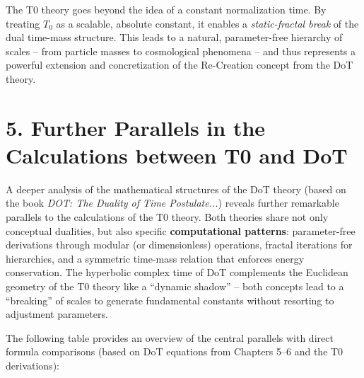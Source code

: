 	\begin{keyresultbox}
		The T0 theory goes beyond the idea of a constant normalization time. By treating \( T_0 \) as a scalable, absolute constant, it enables a \emph{static-fractal break} of the dual time-mass structure. This leads to a natural, parameter-free hierarchy of scales – from particle masses to cosmological phenomena – and thus represents a powerful extension and concretization of the Re-Creation concept from the DoT theory.
	\end{keyresultbox}
	
	
	\section*{5. Further Parallels in the Calculations between T0 and DoT}
	
	A deeper analysis of the mathematical structures of the DoT theory (based on the book \emph{DOT: The Duality of Time Postulate...}) reveals further remarkable parallels to the calculations of the T0 theory. Both theories share not only conceptual dualities, but also specific \textbf{computational patterns}: parameter-free derivations through modular (or dimensionless) operations, fractal iterations for hierarchies, and a symmetric time-mass relation that enforces energy conservation. The hyperbolic complex time of DoT complements the Euclidean geometry of the T0 theory like a ``dynamic shadow'' – both concepts lead to a ``breaking'' of scales to generate fundamental constants without resorting to adjustment parameters.
	
	The following table provides an overview of the central parallels with direct formula comparisons (based on DoT equations from Chapters 5–6 and the T0 derivations):
	
